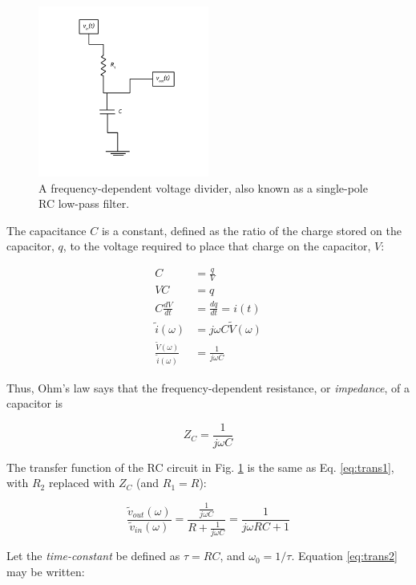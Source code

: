 \documentclass[12pt]{article}
\begin{document}
\begin{figure}
\centering
\includegraphics[width=0.5\textwidth,trim=0cm 1cm 0cm 0cm,clip=true]{LowPass.pdf}
\caption{\label{fig:fig2} A frequency-dependent voltage divider, also known as a single-pole RC low-pass filter.}
\end{figure}

The capacitance $C$ is a constant, defined as the ratio of the charge stored on the capacitor, $q$, to the voltage required to place that charge on the capacitor, $V$:

\begin{align}
C &= \frac{q}{V} \\
VC &= q \\
C \frac{dV}{dt} &= \frac{dq}{dt} = i(t) \\
\tilde{i}(\omega) &= j\omega C \tilde{V}(\omega) \\
\frac{\tilde{V}(\omega)}{\tilde{i}(\omega)} &= \frac{1}{j\omega C}
\end{align}

Thus, Ohm's law says that the frequency-dependent resistance, or \textit{impedance}, of a capacitor is

\begin{equation}
\boxed{
Z_C = \frac{1}{j\omega C}
}
\label{eq:eq5}
\end{equation}

The transfer function of the RC circuit in Fig. \ref{fig:fig2} is the same as Eq. \ref{eq:trans1}, with $R_2$ replaced with $Z_C$ (and $R_1 = R$):

\begin{equation}
\frac{\tilde{v}_{out}(\omega)}{\tilde{v}_{in}(\omega)} = \frac{\frac{1}{j\omega C}}{R+\frac{1}{j\omega C}} = \frac{1}{j\omega R C + 1}
\label{eq:trans2}
\end{equation}

Let the \textit{time-constant} be defined as $\tau = RC$, and $\omega_0 = 1/\tau$.  Equation \ref{eq:trans2} may be written:
\end{document}
